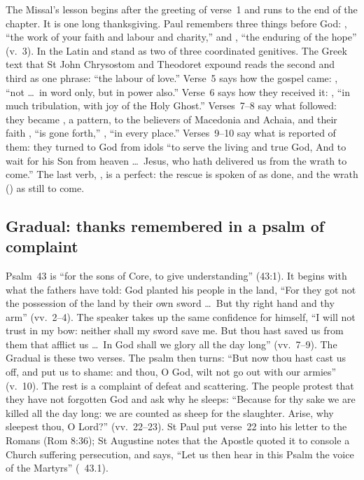 The Missal's lesson begins after the greeting of verse~1 and runs to the end
of the chapter. It is one long thanksgiving. Paul remembers three things
before God: , ``the work
of your faith and labour and charity,'' and , ``the
enduring of the hope'' (v.~3). In the Latin  and
 stand as two of three coordinated genitives. The Greek text
that St John Chrysostom and Theodoret expound reads the second and third as
one phrase: ``the labour of love.'' Verse~5 says how the gospel came:
, ``not \dots\ in word
only, but in power also.'' Verse~6
says how they received it: , ``in much tribulation, with joy of the Holy Ghost.'' Verses~7--8 say
what followed: they became , a pattern, to the believers of
Macedonia and Achaia, and their faith , ``is gone forth,''
, ``in every place.'' Verses~9--10 say what is reported of
them: they turned to God from idols ``to serve the living and true God, And to
wait for his Son from heaven \dots\ Jesus, who hath delivered us from the wrath
to come.'' The last verb, , is a perfect: the rescue is spoken
of as done, and the wrath () as still to come.

\subsection{Gradual: thanks remembered in a psalm of complaint}
\label{sec:element-gradual}

Psalm~43 is ``for the sons of Core, to give understanding'' (43:1). It begins
with what the fathers have told: God planted his people in the land, ``For
they got not the possession of the land by their own sword \dots\ But thy
right hand and thy arm'' (vv.~2--4). The speaker takes up the same confidence
for himself, ``I will not trust in my bow: neither shall my sword save me. But
thou hast saved us from them that afflict us \dots\ In God shall we glory all
the day long'' (vv.~7--9). The Gradual is these two verses. The psalm then
turns: ``But now thou hast cast us off, and put us to shame: and thou, O God,
wilt not go out with our armies'' (v.~10). The rest is a complaint of defeat
and scattering. The people protest that they have not forgotten God and ask
why he sleeps: ``Because for thy sake we are killed all the day long: we are
counted as sheep for the slaughter. Arise, why sleepest thou, O Lord?''
(vv.~22--23). St Paul put verse~22 into his letter to the Romans (Rom 8:36);
St Augustine notes that the Apostle quoted it to console a Church suffering
persecution, and says, ``Let us then hear in this Psalm the voice of the
Martyrs'' (~43.1).

